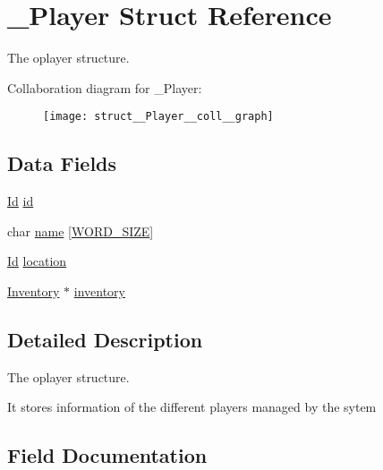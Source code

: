 \hypertarget{struct__Player}{}\section{\+\_\+\+Player Struct Reference}
\label{struct__Player}


The oplayer structure.  




Collaboration diagram for \+\_\+\+Player\+:\nopagebreak
\begin{figure}[H]
\begin{center}
\leavevmode
\texttt{[image: struct\_\_Player\_\_coll\_\_graph]}
\end{center}
\end{figure}
\subsection*{Data Fields}
\begin{DoxyCompactItemize}
\item 
\hyperlink{types_8h_a845e604fb28f7e3d97549da3448149d3}{Id} \hyperlink{struct__Player_a60d635cd063816a9c1bd873f4868bb90}{id}
\item 
char \hyperlink{struct__Player_adda99df91c28eb58d392f2b43fc6898f}{name} \mbox{[}\hyperlink{types_8h_a92ed8507d1cd2331ad09275c5c4c1c89}{W\+O\+R\+D\+\_\+\+S\+I\+ZE}\mbox{]}
\item 
\hyperlink{types_8h_a845e604fb28f7e3d97549da3448149d3}{Id} \hyperlink{struct__Player_adbb6195d15b88f3f658e74274eff52d8}{location}
\item 
\hyperlink{inventory_8h_a2253bf64ac4ce6a9c1d6f39c0b0d32a3}{Inventory} $\ast$ \hyperlink{struct__Player_a5e02924cb82ca61f74ba414d190aa29b}{inventory}
\end{DoxyCompactItemize}


\subsection{Detailed Description}
The oplayer structure. 

It stores information of the different players managed by the sytem 

\subsection{Field Documentation}
\mbox{\label{struct__Player_a60d635cd063816a9c1bd873f4868bb90}} 
